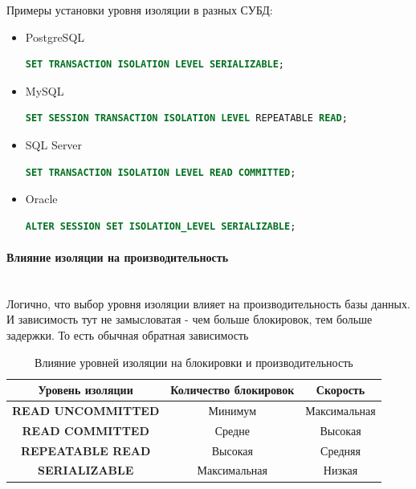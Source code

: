 Примеры установки уровня изоляции в разных СУБД:
\begin{itemize}
    \item PostgreSQL
    \begin{lstlisting}[language=SQL]
        SET TRANSACTION ISOLATION LEVEL SERIALIZABLE;
    \end{lstlisting}

    \item MySQL
    \begin{lstlisting}[language=SQL]
        SET SESSION TRANSACTION ISOLATION LEVEL REPEATABLE READ;
    \end{lstlisting}

    \item SQL Server
    \begin{lstlisting}[language=SQL]
        SET TRANSACTION ISOLATION LEVEL READ COMMITTED;
    \end{lstlisting}

    \item Oracle
    \begin{lstlisting}[language=SQL]
        ALTER SESSION SET ISOLATION_LEVEL SERIALIZABLE;
    \end{lstlisting}

\end{itemize}

\paragraph{Влияние изоляции на производительность} ~\\

Логично, что выбор уровня изоляции влияет на производительность базы данных. И зависимость тут не замысловатая - чем больше блокировок, тем больше задержки. То есть обычная обратная зависимость

\begin{table}[H]
    \centering
    \begin{tabular}{|c|c|c|}
        \hline
        \textbf{Уровень изоляции} & \textbf{Количество блокировок} & \textbf{Скорость} \\
        \hline
        \textbf{READ UNCOMMITTED} & Минимум & Максимальная \\
        \hline
        \textbf{READ COMMITTED} & Средне & Высокая \\
        \hline
        \textbf{REPEATABLE READ} & Высокая & Средняя \\
        \hline
        \textbf{SERIALIZABLE} & Максимальная & Низкая \\
        \hline
    \end{tabular}
    \caption{Влияние уровней изоляции на блокировки и производительность}
    \label{tab:isolation_performance}
\end{table}


